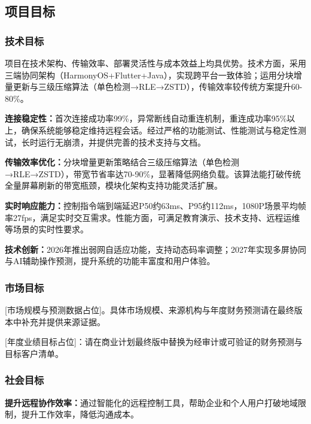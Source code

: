 \documentclass[12pt,a4paper]{article}
\begin{document}
\subsection{项目目标}

\subsubsection{技术目标}

项目在技术架构、传输效率、部署灵活性与成本效益上均具优势。技术方面，采用三端协同架构（HarmonyOS+Flutter+Java），实现跨平台一致体验；运用分块增量更新与三级压缩算法（单色检测→RLE→ZSTD），传输效率较传统方案提升60-80\%。

\textbf{连接稳定性：}首次连接成功率99\%，异常断线自动重连机制，重连成功率95\%以上，确保系统能够稳定维持远程会话。经过严格的功能测试、性能测试与稳定性测试，长时运行无崩溃，并提供完善的技术支持与文档。

\textbf{传输效率优化：}分块增量更新策略结合三级压缩算法（单色检测→RLE→ZSTD），带宽节省率达70-90\%，显著降低网络负载。该算法能打破传统全量屏幕刷新的带宽瓶颈，模块化架构支持功能灵活扩展。

\textbf{实时响应能力：}控制指令端到端延迟P50约63ms、P95约112ms，1080P场景平均帧率27fps，满足实时交互需求。性能方面，可满足教育演示、技术支持、远程运维等场景的实时性要求。

\textbf{技术创新：}2026年推出弱网自适应功能，支持动态码率调整；2027年实现多屏协同与AI辅助操作预测，提升系统的功能丰富度和用户体验。

\subsubsection{市场目标}


[市场规模与预测数据占位]。具体市场规模、来源机构与年度财务预测请在最终版本中补充并提供来源证据。

[年度业绩目标占位]：请在商业计划最终版中替换为经审计或可验证的财务预测与目标客户清单。

\subsubsection{社会目标}
\textbf{提升远程协作效率：}通过智能化的远程控制工具，帮助企业和个人用户打破地域限制，提升工作效率，降低沟通成本。
\end{document}

